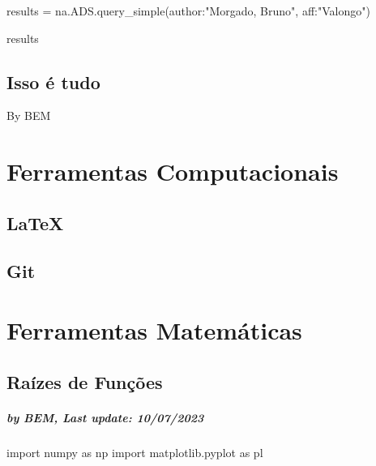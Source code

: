 \documentclass[
  letterpaper,
  DIV=11,
  numbers=noendperiod]{scrreprt}
\newenvironment{Shaded}{\begin{snugshade}}{\end{snugshade}}
\newcommand{\ImportTok}[1]{\textcolor[rgb]{0.00,0.46,0.62}{#1}}
\newcommand{\NormalTok}[1]{\textcolor[rgb]{0.00,0.23,0.31}{#1}}
\newcommand{\OperatorTok}[1]{\textcolor[rgb]{0.37,0.37,0.37}{#1}}
\newcommand{\StringTok}[1]{\textcolor[rgb]{0.13,0.47,0.30}{#1}}
\begin{document}
\begin{Shaded}
\begin{Highlighting}[]
\NormalTok{results }\OperatorTok{=}\NormalTok{ na.ADS.query\_simple(}\StringTok{\textquotesingle{}author:"Morgado, Bruno", aff:"Valongo"\textquotesingle{}}\NormalTok{)}
\end{Highlighting}
\end{Shaded}

\begin{Shaded}
\begin{Highlighting}[]
\NormalTok{results}
\end{Highlighting}
\end{Shaded}

\chapter{Isso é tudo}\label{isso-uxe9-tudo-3}

By BEM

\part{Ferramentas Computacionais}

\chapter{LaTeX}\label{latex}

\chapter{Git}\label{git}

\part{Ferramentas Matemáticas}

\chapter{Raízes de Funções}\label{rauxedzes-de-funuxe7uxf5es}

\subsubsection{by BEM, Last update:
10/07/2023}\label{by-bem-last-update-10072023}

\begin{Shaded}
\begin{Highlighting}[]
\ImportTok{import}\NormalTok{ numpy }\ImportTok{as}\NormalTok{ np}
\ImportTok{import}\NormalTok{ matplotlib.pyplot }\ImportTok{as}\NormalTok{ pl}
\end{Highlighting}
\end{Shaded}
\end{document}
